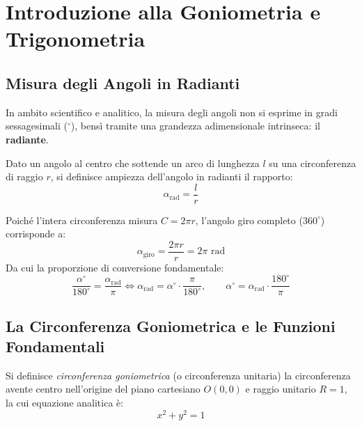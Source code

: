\documentclass[11pt,a4paper,oneside]{report}
\begin{document}
\chapter{Introduzione alla Goniometria e Trigonometria}

\section{Misura degli Angoli in Radianti}
In ambito scientifico e analitico, la misura degli angoli non si esprime in gradi sessagesimali ($^\circ$), bensì tramite una grandezza adimensionale intrinseca: il \textbf{radiante}.

\begin{definizione}[Radiante]
Dato un angolo al centro che sottende un arco di lunghezza $l$ su una circonferenza di raggio $r$, si definisce ampiezza dell'angolo in radianti il rapporto:
\begin{equation}
    \alpha_{\text{rad}} = \frac{l}{r}
\end{equation}
\end{definizione}
Poiché l'intera circonferenza misura $C = 2\pi r$, l'angolo giro completo ($360^\circ$) corrisponde a:
\begin{equation}
    \alpha_{\text{giro}} = \frac{2\pi r}{r} = 2\pi\text{ rad}
\end{equation}
Da cui la proporzione di conversione fondamentale:
\begin{equation}
    \frac{\alpha^\circ}{180^\circ} = \frac{\alpha_{\text{rad}}}{\pi} \iff \alpha_{\text{rad}} = \alpha^\circ \cdot \frac{\pi}{180^\circ}, \qquad \alpha^\circ = \alpha_{\text{rad}} \cdot \frac{180^\circ}{\pi}
\end{equation}

\section{La Circonferenza Goniometrica e le Funzioni Fondamentali}

\begin{definizione}
Si definisce \emph{circonferenza goniometrica} (o circonferenza unitaria) la circonferenza avente centro nell'origine del piano cartesiano $O(0,0)$ e raggio unitario $R = 1$, la cui equazione analitica è:
\begin{equation}
    x^2 + y^2 = 1
\end{equation}
\end{definizione}
\end{document}
